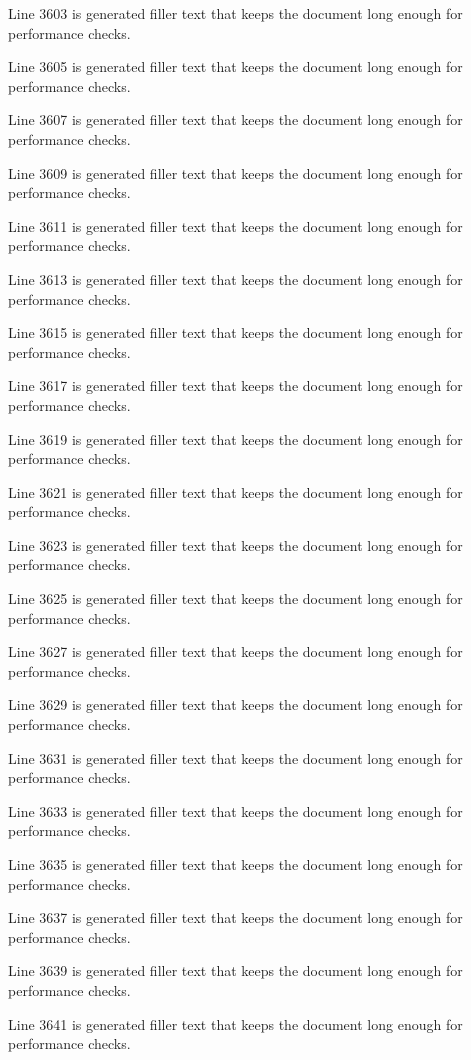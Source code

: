 Line 3603 is generated filler text that keeps the document long enough for performance checks.

Line 3605 is generated filler text that keeps the document long enough for performance checks.

Line 3607 is generated filler text that keeps the document long enough for performance checks.

Line 3609 is generated filler text that keeps the document long enough for performance checks.

Line 3611 is generated filler text that keeps the document long enough for performance checks.

Line 3613 is generated filler text that keeps the document long enough for performance checks.

Line 3615 is generated filler text that keeps the document long enough for performance checks.

Line 3617 is generated filler text that keeps the document long enough for performance checks.

Line 3619 is generated filler text that keeps the document long enough for performance checks.

Line 3621 is generated filler text that keeps the document long enough for performance checks.

Line 3623 is generated filler text that keeps the document long enough for performance checks.

Line 3625 is generated filler text that keeps the document long enough for performance checks.

Line 3627 is generated filler text that keeps the document long enough for performance checks.

Line 3629 is generated filler text that keeps the document long enough for performance checks.

Line 3631 is generated filler text that keeps the document long enough for performance checks.

Line 3633 is generated filler text that keeps the document long enough for performance checks.

Line 3635 is generated filler text that keeps the document long enough for performance checks.

Line 3637 is generated filler text that keeps the document long enough for performance checks.

Line 3639 is generated filler text that keeps the document long enough for performance checks.

Line 3641 is generated filler text that keeps the document long enough for performance checks.

